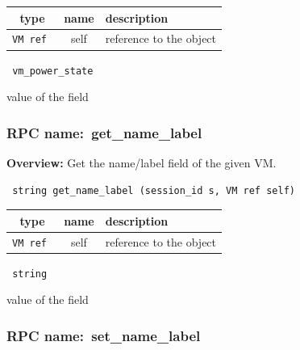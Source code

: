 
 
\vspace{0.3cm}
\begin{tabular}{|c|c|p{7cm}|}
 \hline
{\bf type} & {\bf name} & {\bf description} \\ \hline
{\tt VM ref } & self & reference to the object \\ \hline 

\end{tabular}

\vspace{0.3cm}

{\tt 
vm\_power\_state
}


value of the field
\vspace{0.3cm}
\vspace{0.3cm}
\vspace{0.3cm}
\subsubsection{RPC name:~get\_name\_label}

{\bf Overview:} 
Get the name/label field of the given VM.

\begin{verbatim} string get_name_label (session_id s, VM ref self)\end{verbatim}



 
\vspace{0.3cm}
\begin{tabular}{|c|c|p{7cm}|}
 \hline
{\bf type} & {\bf name} & {\bf description} \\ \hline
{\tt VM ref } & self & reference to the object \\ \hline 

\end{tabular}

\vspace{0.3cm}

{\tt 
string
}


value of the field
\vspace{0.3cm}
\vspace{0.3cm}
\vspace{0.3cm}
\subsubsection{RPC name:~set\_name\_label}

